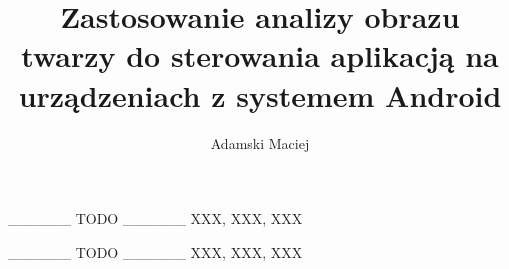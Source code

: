 \documentclass[
    left=2.5cm,         %
    right=2.5cm,        %
    top=2.5cm,          %
    bottom=3cm,         %
    bindingoffset=6mm,  %
    nohyphenation=false %
]{eiti/eiti-thesis}
\begin{document}
\EngineerThesis %
{}
\title{
    Zastosowanie analizy obrazu twarzy do sterowania aplikacją na urządzeniach z systemem Android 
}
\author{Adamski Maciej}
\date{\the\year}
\maketitle

 \cleardoublepage %
 \streszczenie
 \_\_\_\_\_\_ TODO \_\_\_\_\_\_ 
 \slowakluczowe XXX, XXX, XXX

 \newpage
 \abstract
 \_\_\_\_\_\_ TODO \_\_\_\_\_\_ 
 \keywords XXX, XXX, XXX


\cleardoublepage %
\tableofcontents

\cleardoublepage %
\pagestyle{headings}












\cleardoublepage %
\printbibliography

\newpage
\pagestyle{plain}
\end{document}
